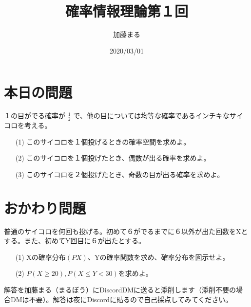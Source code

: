 \documentclass[a4j,uplatex]{jsarticle}
\title{確率情報理論第１回}
\author{加藤まる}
\date{2020/03/01}
\begin{document}
\maketitle
\section*{本日の問題}

１の目がでる確率が $\frac{1}{2}$ で、他の目については均等な確率であるインチキなサイコロを考える。
\begin{itemize}
  \item[(1)] このサイコロを１個投げるときの確率空間を求めよ。 
  \item[(2)] このサイコロを１個投げたとき、偶数が出る確率を求めよ。
  \item[(3)] このサイコロを２個投げたとき、奇数の目が出る確率を求めよ。 
\end{itemize}

\section*{おかわり問題}
普通のサイコロを何回も投げる。初めて６がでるまでに６以外が出た回数をXとする。また、初めてY回目に６が出たとする。
\begin{itemize}
  \item[(1)] Xの確率分布$(PX)$、Yの確率関数を求め、確率分布を図示せよ。
  \item[(2)] $ P(X\ge20) , P(X\le Y<30) $を求めよ。 
\end{itemize}

解答を加藤まる（まるぼう）にDiscordDMに送ると添削します（添削不要の場合DMは不要）。解答は夜にDiscordに貼るので自己採点してみてください。
\end{document}
